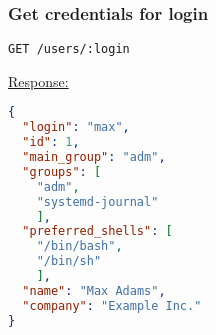 %
%
%
%
%
%
%


\subsubsection{Get credentials for login}

\begin{lstlisting}[language=http_request]
GET /users/:login
\end{lstlisting}


{\tiny \underline{Response:}}
\begin{lstlisting}[language=json, numbers=none]
{
  "login": "max",
  "id": 1,
  "main_group": "adm",
  "groups": [
    "adm",
    "systemd-journal"
    ],
  "preferred_shells": [
    "/bin/bash",
    "/bin/sh"
    ],
  "name": "Max Adams",
  "company": "Example Inc."
}
\end{lstlisting}
